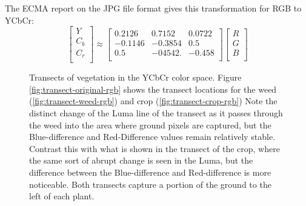 \documentclass[letterpaper]{report}
\begin{document}
The ECMA report on the JPG file format gives this transformation for RGB to YCbCr:
\nocite{Ecma2019-yo}
\begin{equation}
	\begin{bmatrix}
	Y \\[0.3em]
	C_b \\[0.3em]
	C_r \\[0.3em]
	\end{bmatrix}
	\approx
	\begin{bmatrix}
	0.2126 & 0.7152 & 0.0722 \\[0.3em]
	-0.1146 & -0.3854 & 0.5 \\[0.3em]
	0.5 & -04542. & -0.458 \\[0.3em]
	\end{bmatrix}
	\begin{bmatrix}
	R \\[0.3em]
	G \\[0.3em]
	B \\[0.3em]
	\end{bmatrix}	
\end{equation}

\begin{figure}[h]
	\centering
	\hfill
	\hfill
	\caption[YCbCr Transects]{Transects of vegetation in the YCbCr color space. Figure \ref{fig:transect-original-rgb} shows the transect locations for the weed (\ref{fig:transect-weed-rgb}) and crop (\ref{fig:transect-crop-rgb}) Note the distinct change of the Luma line of the transect as it passes through the weed into the area where ground pixels are captured, but the Blue-difference and Red-Difference values remain relatively stable. Contrast this with what is shown in the transect of the crop, where the same sort of abrupt change is seen in the Luma, but the difference between the Blue-difference and Red-difference is more noticeable. Both transects capture a portion of the ground to the left of each plant.}
	\label{fig:transects-ycbcr}
\end{figure}
\end{document}
